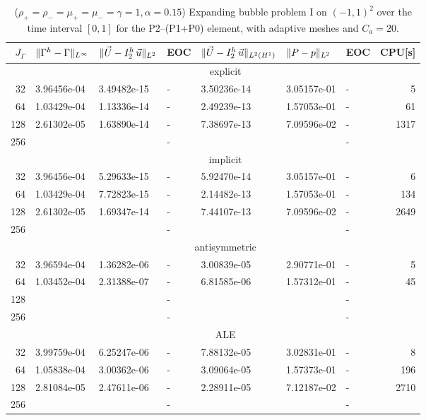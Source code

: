 \begin{table}
\center
\hspace*{-3.25cm}
\begin{tabular}{rllllllr}
\hline
$J_\Gamma$ & $\|\Gamma^h - \Gamma\|_{L^\infty}$ & $\|\vec U - I^h_{2}\,\vec u\|_{L^2}$ & EOC & $\|\vec U - I^h_{2}\,\vec u\|_{L^2(H^1)}$ & $\|P - p\|_{L^2}$ & EOC
& CPU[s] \\
\hline
& \multicolumn{7}{c}{explicit} \\
\hline
 32 & 3.96456e-04 & 3.49482e-15 & - & 3.50236e-14 & 3.05157e-01 & - &    5 \\
 64 & 1.03429e-04 & 1.13336e-14 & - & 2.49239e-13 & 1.57053e-01 & - &   61 \\
128 & 2.61302e-05 & 1.63890e-14 & - & 7.38697e-13 & 7.09596e-02 & - & 1317 \\
256 & & & - & & & - & \\
\hline
& \multicolumn{7}{c}{implicit} \\
\hline
 32 & 3.96456e-04 & 5.29633e-15 & - & 5.92470e-14 & 3.05157e-01 & - &    6 \\
 64 & 1.03429e-04 & 7.72823e-15 & - & 2.14482e-13 & 1.57053e-01 & - &  134 \\
128 & 2.61302e-05 & 1.69347e-14 & - & 7.44107e-13 & 7.09596e-02 & - & 2649 \\
256 & & & - & & & - & \\
\hline
& \multicolumn{7}{c}{antisymmetric} \\
\hline
 32 & 3.96594e-04 & 1.36282e-06 & - & 3.00839e-05 & 2.90771e-01 & - &  5 \\
 64 & 1.03452e-04 & 2.31388e-07 & - & 6.81585e-06 & 1.57312e-01 & - & 45 \\
128 & & & - & & & - & \\
256 & & & - & & & - & \\
\hline
& \multicolumn{7}{c}{ALE} \\
\hline
 32 & 3.99759e-04 & 6.25247e-06 & - & 7.88132e-05 & 3.02831e-01 & - &    8 \\
 64 & 1.05838e-04 & 3.00362e-06 & - & 3.09064e-05 & 1.57373e-01 & - &  196 \\
128 & 2.81084e-05 & 2.47611e-06 & - & 2.28911e-05 & 7.12187e-02 & - & 2710 \\
256 & & & - & & & - & \\
\hline
\end{tabular}
\hspace*{-3.25cm}
\caption[Navier--Stokes expanding bubble I errors P2--(P1+P0)]
{($\rho_+ = \rho_- = \mu_+ = \mu_- = \gamma = 1,\alpha=0.15$)
Expanding bubble problem I on $(-1,1)^2$ over the time interval $[0,1]$ for the
P2--(P1+P0) element, with adaptive meshes and $C_a=20$\textdegree.}
\label{tab:nsexpandingbubbleIp2p1p0}
\end{table}

